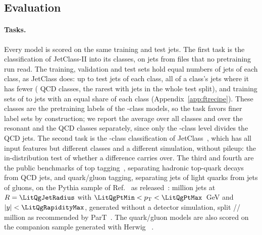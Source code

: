 \documentclass[11pt]{article}
\newcommand{\Kfull}{\VocabSizeLoneeighteight}
\begin{document}
\subsection{Evaluation}\label{sec:eval}

\paragraph{Tasks.} Every model is scored on the same training and test jets. The first task is the
classification of JetClass-II into its \Kfull{} classes, on jets from files that no pretraining run
read. The training, validation and test sets hold equal numbers of jets of each class, as JetClass
does: up to \JcBalTestPerClass{} test jets of each class, all of a class's jets where it has fewer
(\JcBalNShort{} QCD classes, the rarest with \JcBalRarestTest{} jets in the whole test split), and
training sets of \FtSizeEThree{} to \FtSizeESix{} jets with an equal share of each class
(Appendix~\ref{app:ftrecipe}). These classes are the pretraining labels of the \Kfull-class models,
so the task favors finer label sets by construction; we report the average over all classes and
over the resonant and the QCD classes separately, since only the \Kfull-class level divides the QCD
jets. The second task is the \FtNClassesJc-class classification of JetClass~\cite{part}, which has
all \FillNFeatures{} input features but different classes and a different simulation, without pileup:
the in-distribution test of whether a difference carries over. The third and fourth are the public
benchmarks of top tagging~\cite{toptag}, separating hadronic top-quark decays from QCD jets, and
quark/gluon tagging, separating jets of light quarks from jets of gluons, on the Pythia sample of
Ref.~\cite{efn} as released~\cite{qgpythia}: \LitQgNJetsMillion{} million jets at $R =
\LitQgJetRadius$ with $\LitQgPtMin < p_{\mathrm T} < \LitQgPtMax$~GeV and $|y| < \LitQgRapidityMax$,
generated without a detector simulation, split \LitQgTrainMillion/\LitQgValMillion/\LitQgValMillion{}
million as recommended by ParT~\cite[Sec.~5.2]{part}. The quark/gluon models are also scored on the
companion sample generated with Herwig \LitHerwigVersion~\cite{herwigsevenone,qgherwig}.
\end{document}
